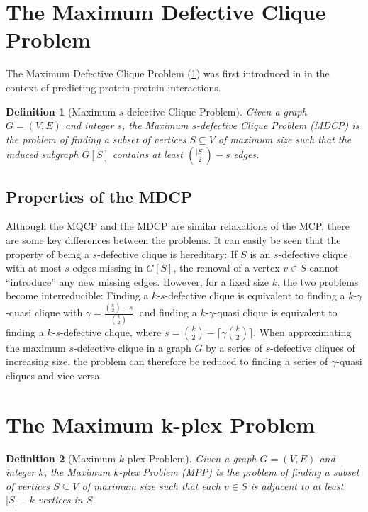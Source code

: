 \documentclass[draft,final]{vutinfth} %
\newtheorem{definition}{Definition}[section]
\begin{document}
\section{The Maximum Defective Clique Problem}\label{sec:mdcp}

The Maximum Defective Clique Problem (\ref{def:mdcp}) was first introduced in \cite{Yu2006} in the context of predicting protein-protein interactions. 

\begin{definition}[Maximum $s$-defective-Clique Problem]
	\label{def:mdcp}
	Given a graph \\ 
    $G = (V,E)$ and integer $s$, the Maximum $s$-defective Clique Problem (MDCP) is the problem of finding a subset of vertices $S \subseteq V$ of maximum size 
	such that the induced subgraph $G[S]$ contains at least $\binom{|S|}{2} - s$ edges. 
\end{definition}

\subsection{Properties of the MDCP}

Although the MQCP and the MDCP are similar relaxations of the MCP, there are some key differences between the problems. It can easily be seen that the property of being a $s$-defective clique is hereditary: If $S$ is an $s$-defective clique with at most $s$ edges missing in $G[S]$, the removal of a vertex $v \in S$ cannot ``introduce'' any new missing edges.  
However, for a fixed size $k$, the two problems become interreducible: 
Finding a $k$-$s$-defective clique is equivalent to finding a $k$-$\gamma$-quasi clique with $\gamma = \frac{\binom{k}{2} - s}{\binom{k}{2}} $, and finding a $k$-$\gamma$-quasi clique is equivalent to finding a $k$-$s$-defective clique, where $s = \binom{k}{2} - \lceil \gamma \binom{k}{2} \rceil$. 
When approximating the maximum $s$-defective clique in a graph $G$ by a series of $s$-defective cliques of increasing size, the problem can therefore be reduced to finding a series of $\gamma$-quasi cliques and vice-versa.


\section{The Maximum k-plex Problem}\label{sec:mpp}


\begin{definition}[Maximum $k$-plex Problem]
	\label{def:mpp}
	Given a graph $G = (V,E)$ and integer $k$, the Maximum $k$-plex Problem (MPP) is the problem of finding a subset of vertices $S \subseteq V$ of maximum size 
	such that each $v \in S$ is adjacent to at least $|S| - k$ vertices in $S$. 
\end{definition}
\end{document}
